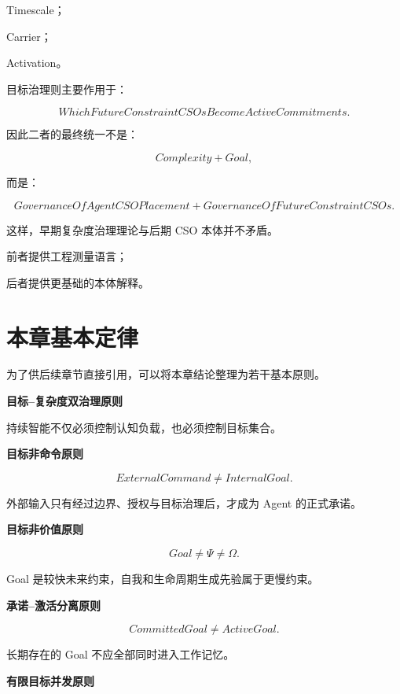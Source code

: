 Timescale；

Carrier；

Activation。

目标治理则主要作用于：

\[
\boxed{
WhichFutureConstraintCSOsBecomeActiveCommitments.
}
\]

因此二者的最终统一不是：

\[
Complexity+Goal,
\]

而是：

\[
\boxed{
GovernanceOfAgentCSOPlacement
+
GovernanceOfFutureConstraintCSOs.
}
\]

这样，早期复杂度治理理论与后期 CSO 本体并不矛盾。

前者提供工程测量语言；

后者提供更基础的本体解释。


\section{本章基本定律}

为了供后续章节直接引用，可以将本章结论整理为若干基本原则。

\textbf{目标--复杂度双治理原则}

\begin{statementbox}
\centering
{}
\end{statementbox}

持续智能不仅必须控制认知负载，也必须控制目标集合。


\textbf{目标非命令原则}

\[
\boxed{
ExternalCommand
\neq
InternalGoal.
}
\]

外部输入只有经过边界、授权与目标治理后，才成为 Agent 的正式承诺。


\textbf{目标非价值原则}

\[
\boxed{
Goal
\neq
\Psi
\neq
\Omega.
}
\]

Goal 是较快未来约束，自我和生命周期生成先验属于更慢约束。


\textbf{承诺--激活分离原则}

\[
\boxed{
CommittedGoal
\neq
ActiveGoal.
}
\]

长期存在的 Goal 不应全部同时进入工作记忆。


\textbf{有限目标并发原则}

\begin{statementbox}
\centering
{}
\end{statementbox}

